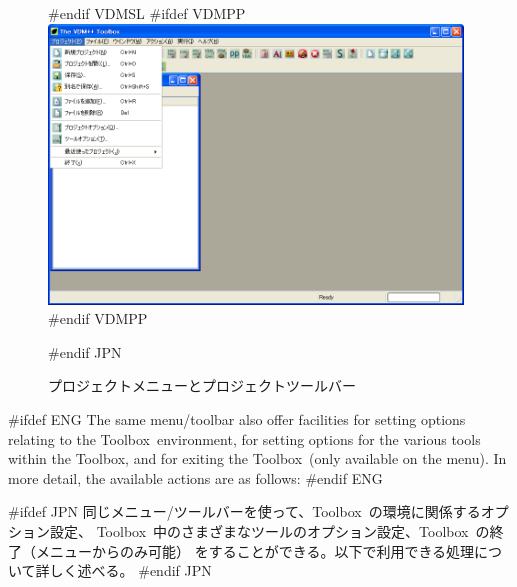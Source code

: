 \documentclass[\pformat,12pt]{article}
\newcommand{\Toolbox}{Toolbox}
\newcommand{\Toolbox}{Toolbox}
\begin{document}
\begin{figure}[tbh]
\begin{center}
#endif VDMSL
#ifdef VDMPP
\includegraphics[width=11cm]{projectMenuToolbar-pp.png}
#endif VDMPP
\caption{プロジェクトメニューとプロジェクトツールバー}
#endif JPN
\label{fig:projectMenuToolbar}
\end{center}
\end{figure}

#ifdef ENG
The same menu/toolbar also offer facilities for setting options
relating to the \Toolbox\ environment, for setting options for the
various tools within the \Toolbox, and for exiting the \Toolbox\
(only available on the menu). In more  detail, the available actions
are as follows:
#endif ENG

#ifdef JPN
同じメニュー/ツールバーを使って、\Toolbox\ の環境に関係するオプション設定、
\Toolbox\ 中のさまざまなツールのオプション設定、\Toolbox\ の終了（メニューからのみ可能）
をすることができる。以下で利用できる処理について詳しく述べる。
#endif JPN
\end{document}
